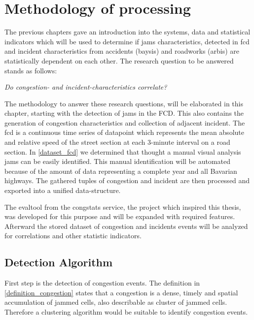 \documentclass[a4paper,headsepline,footsepline,fontsize=11pt,BCOR=12mm,DIV=12]{report}
\begin{document}
\chapter{Methodology of processing}
\label{methodology}
The previous chapters gave an introduction into the systems, data and statistical indicators which will be used to determine if jams characteristics, detected in \acrshort{fcd} and incident characteristics from accidents (\acrshort{baysis}) and roadworks (\acrshort{arbis}) are statistically dependent on each other. The research question to be answered stands as follows:

\begin{center}
	\textit{Do congestion- and incident-characteristics correlate?}
\end{center}

\medskip

The methodology to answer these research questions, will be elaborated in this chapter, starting with the detection of jams in the FCD. This also contains the generation of congestion characteristics and collection of adjacent incident. The \acrshort{fcd} is a continuous time series of datapoint which represents the mean absolute and relative speed of the street section at each 3-minute interval on a road section. In \ref{dataset_fcd} we determined that thought a manual visual analysis jams can be easily identified. This manual identification will be automated because of the amount of data representing a complete year and all Bavarian highways. The gathered tuples of congestion and incident are then processed and exported into a unified data-structure. 

The \gls{evaltool} from the \gls{congstats} service, the project which inspired this thesis, was developed for this purpose and will be expanded with required features. Afterward the stored dataset of congestion and incidents events will be analyzed for correlations and other statistic indicators.

\bigskip

\section{Detection Algorithm}
First step is the detection of congestion events. The definition in \ref{definition_congestion} states that a congestion is a dense, timely and spatial accumulation of jammed cells, also describable as cluster of jammed cells. Therefore a clustering algorithm would be suitable to identify congestion events.
\end{document}
